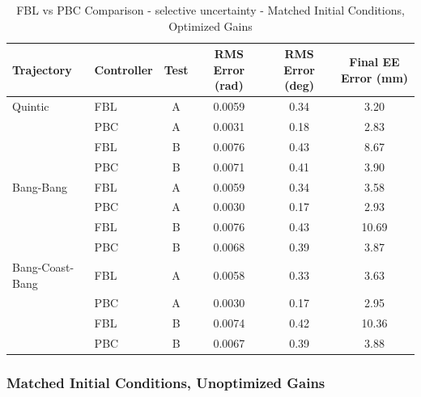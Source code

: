 \documentclass[11pt,a4paper]{article}
\begin{document}
\begin{table}[H]
\centering
\caption{FBL vs PBC Comparison - selective uncertainty - Matched Initial Conditions, Optimized Gains}
\begin{tabular}{llcccc}
\toprule
Trajectory & Controller & Test & RMS Error (rad) & RMS Error (deg) & Final EE Error (mm) \\
\midrule
Quintic & FBL & A & 0.0059 & 0.34 & 3.20 \\
 & PBC & A & \textcolor{bestcolor}{0.0031} & \textcolor{bestcolor}{0.18} & \textcolor{bestcolor}{2.83} \\
 & FBL & B & 0.0076 & 0.43 & 8.67 \\
 & PBC & B & \textcolor{bestcolor}{0.0071} & \textcolor{bestcolor}{0.41} & \textcolor{bestcolor}{3.90} \\
\midrule
Bang-Bang & FBL & A & 0.0059 & 0.34 & 3.58 \\
 & PBC & A & \textcolor{bestcolor}{0.0030} & \textcolor{bestcolor}{0.17} & \textcolor{bestcolor}{2.93} \\
 & FBL & B & 0.0076 & 0.43 & 10.69 \\
 & PBC & B & \textcolor{bestcolor}{0.0068} & \textcolor{bestcolor}{0.39} & \textcolor{bestcolor}{3.87} \\
\midrule
Bang-Coast-Bang & FBL & A & 0.0058 & 0.33 & 3.63 \\
 & PBC & A & \textcolor{bestcolor}{0.0030} & \textcolor{bestcolor}{0.17} & \textcolor{bestcolor}{2.95} \\
 & FBL & B & 0.0074 & 0.42 & 10.36 \\
 & PBC & B & \textcolor{bestcolor}{0.0067} & \textcolor{bestcolor}{0.39} & \textcolor{bestcolor}{3.88} \\
\bottomrule
\end{tabular}
\end{table}

\subsubsection{Matched Initial Conditions, Unoptimized Gains}
\end{document}

